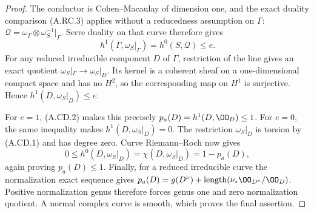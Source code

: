 \begin{proof}
The conductor is Cohen--Macaulay of dimension one,
and the exact duality comparison (A.RC.3) applies
without a reducedness assumption on $\Gamma$:
$\mathcal Q=\omega_\Gamma\otimes\omega_S^{-1}|_\Gamma$.
Serre duality on that curve therefore gives
\[
 h^1(\Gamma,\omega_S|_\Gamma)
       =h^0(S,\mathcal Q)\le e.                   \tag{A.CD.4}
\]
For any reduced irreducible component $D$ of $\Gamma$,
restriction of the line gives an exact quotient
$\omega_S|_\Gamma\to\omega_S|_D$. Its kernel is a
coherent sheaf on a one-dimensional compact space and
has no $H^2$, so the corresponding map on $H^1$ is
surjective. Hence
$h^1(D,\omega_S|_D)\le e$.

For $e=1$, (A.CD.2) makes this precisely
$p_a(D)=h^1(D,\OO_D)\le1$.
For $e=0$, the same inequality makes
$h^1(D,\omega_S|_D)=0$.
The restriction $\omega_S|_D$ is torsion by (A.CD.1)
and has degree zero. Curve Riemann--Roch now gives
\[
 0\le h^0(D,\omega_S|_D)
       =\chi(D,\omega_S|_D)=1-p_a(D),
\]
again proving $p_a(D)\le1$.
Finally, for a reduced irreducible curve the
normalization exact sequence gives
$p_a(D)=g(D^\nu)+\operatorname{length}
(\nu_*\OO_{D^\nu}/\OO_D)$.
Positive normalization genus therefore forces genus
one and zero normalization quotient. A normal complex
curve is smooth, which proves the final assertion.
\end{proof}

